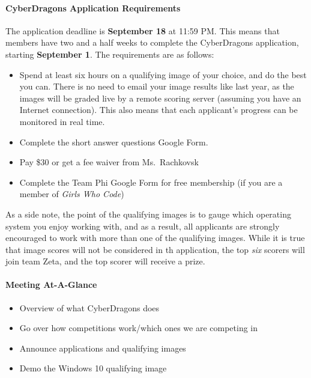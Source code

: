 \documentclass[
  letterpaper,
  DIV=11,
  numbers=noendperiod]{scrartcl}
\let\oldparagraph\paragraph
\renewcommand{\paragraph}[1]{\oldparagraph{#1}\mbox{}}
\providecommand{\tightlist}{%
  \setlength{\itemsep}{0pt}\setlength{\parskip}{0pt}}\usepackage{longtable,booktabs,array}
\begin{document}
\hypertarget{cyberdragons-application-requirements}{%
\paragraph{CyberDragons Application
Requirements}\label{cyberdragons-application-requirements}}

The application deadline is \textbf{September 18} at 11:59 PM. This
means that members have two and a half weeks to complete the
CyberDragons application, starting \textbf{September 1}. The
requirements are as follows:

\begin{itemize}
\tightlist
\item
  Spend at least six hours on a qualifying image of your choice, and do
  the best you can. There is no need to email your image results like
  last year, as the images will be graded live by a remote scoring
  server (assuming you have an Internet connection). This also means
  that each applicant's progress can be monitored in real time.
\item
  Complete the short answer questions Google Form.
\item
  Pay \$30 or get a fee waiver from Ms.~Rachkovsk
\item
  Complete the Team Phi Google Form for free membership (if you are a
  member of \emph{Girls Who Code})
\end{itemize}

As a side note, the point of the qualifying images is to gauge which
operating system you enjoy working with, and as a result, all applicants
are strongly encouraged to work with more than one of the qualifying
images. While it is true that image scores will not be considered in th
application, the top \emph{six} scorers will join team Zeta, and the top
scorer will receive a prize.

\hypertarget{meeting-at-a-glance}{%
\paragraph{Meeting At-A-Glance}\label{meeting-at-a-glance}}

\begin{itemize}
\tightlist
\item
  Overview of what CyberDragons does
\item
  Go over how competitions work/which ones we are competing in
\item
  Announce applications and qualifying images
\item
  Demo the Windows 10 qualifying image
\end{itemize}
\end{document}
